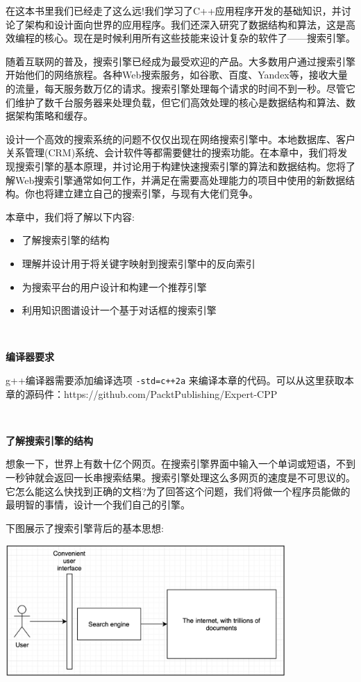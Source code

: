 在这本书里我们已经走了这么远!我们学习了C++应用程序开发的基础知识，并讨论了架构和设计面向世界的应用程序。我们还深入研究了数据结构和算法，这是高效编程的核心。现在是时候利用所有这些技能来设计复杂的软件了——搜索引擎。 \par
随着互联网的普及，搜索引擎已经成为最受欢迎的产品。大多数用户通过搜索引擎开始他们的网络旅程。各种Web搜索服务，如谷歌、百度、Yandex等，接收大量的流量，每天服务数万亿的请求。搜索引擎处理每个请求的时间不到一秒。尽管它们维护了数千台服务器来处理负载，但它们高效处理的核心是数据结构和算法、数据架构策略和缓存。 \par
设计一个高效的搜索系统的问题不仅仅出现在网络搜索引擎中。本地数据库、客户关系管理(CRM)系统、会计软件等都需要健壮的搜索功能。在本章中，我们将发现搜索引擎的基本原理，并讨论用于构建快速搜索引擎的算法和数据结构。您将了解Web搜索引擎通常如何工作，并满足在需要高处理能力的项目中使用的新数据结构。你也将建立建立自己的搜索引擎，与现有大佬们竞争。 \par

本章中，我们将了解以下内容: \par

\begin{itemize}
	\item 了解搜索引擎的结构
	\item 理解并设计用于将关键字映射到搜索引擎中的反向索引
	\item 为搜索平台的用户设计和构建一个推荐引擎
	\item 利用知识图谱设计一个基于对话框的搜索引擎
\end{itemize}

\noindent\textbf{}\ \par
\textbf{编译器要求} \ \par
g++编译器需要添加编译选项 \texttt{-std=c++2a} 来编译本章的代码。可以从这里获取本章的源码件：https:/​/github.​com/PacktPublishing/Expert-CPP \par

\noindent\textbf{}\ \par
\textbf{了解搜索引擎的结构} \ \par
想象一下，世界上有数十亿个网页。在搜索引擎界面中输入一个单词或短语，不到一秒钟就会返回一长串搜索结果。搜索引擎处理这么多网页的速度是不可思议的。它怎么能这么快找到正确的文档?为了回答这个问题，我们将做一个程序员能做的最明智的事情，设计一个我们自己的引擎。 \par
下图展示了搜索引擎背后的基本思想: \par

\begin{center}
	\includegraphics[width=0.8\textwidth]{content/Section-3/Chapter-16/1}
\end{center}

